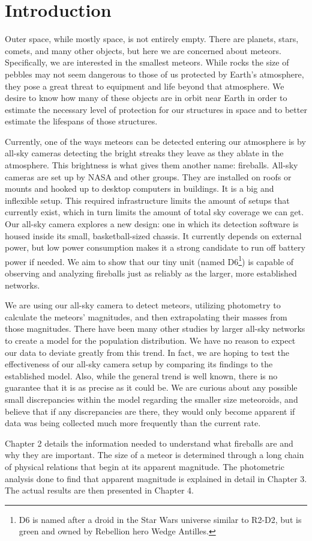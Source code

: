 \chapter{Introduction}

Outer space, while mostly space, is not entirely empty.  There are planets, stars, comets, and many other objects, but here we are concerned about meteors. Specifically, we are interested in the smallest meteors. While rocks the size of pebbles may not seem dangerous to those of us protected by Earth's atmosphere, they pose a great threat to equipment and life beyond that atmosphere. We desire to know how many of these objects are in orbit near Earth in order to estimate the necessary level of protection for our structures in space and to better estimate the lifespans of those structures.

Currently, one of the ways meteors can be detected entering our atmosphere is by all-sky cameras detecting the bright streaks they leave as they ablate in the atmosphere. This brightness is what gives them another name: fireballs. All-sky cameras are set up by NASA and other groups\cite{Jenniskens2011,Trigo-Rodriguez2007}. They are installed on roofs or mounts and hooked up to desktop computers in buildings. It is a big and inflexible setup. This required infrastructure limits the amount of setups that currently exist, which in turn limits the amount of total sky coverage we can get. Our all-sky camera explores a new design: one in which its detection software is housed inside its small, basketball-sized chassis. It currently depends on external power, but low power consumption makes it a strong candidate to run off battery power if needed. We aim to show that our tiny unit (named D6\footnote{D6 is named after a droid in the Star Wars universe similar to R2-D2, but is green and owned by Rebellion hero Wedge Antilles.}) is capable of observing and analyzing fireballs just as reliably as the larger, more established networks.

We are using our all-sky camera to detect meteors, utilizing photometry to calculate the meteors' magnitudes, and then extrapolating their masses from those magnitudes. There have been many other studies by larger all-sky networks to create a model for the population distribution. We have no reason to expect our data to deviate greatly from this trend. In fact, we are hoping to test the effectiveness of our all-sky camera setup by comparing its findings to the established model. Also, while the general trend is well known, there is no guarantee that it is as precise as it could be. We are curious about any possible small discrepancies within the model regarding the smaller size meteoroids, and believe that if any discrepancies are there, they would only become apparent if data was being collected much more frequently than the current rate.

Chapter 2 details the information needed to understand what fireballs are and why they are important. The size of a meteor is determined through a long chain of physical relations that begin at its apparent magnitude. The photometric analysis done to find that apparent magnitude is explained in detail in Chapter 3. The actual results are then presented in Chapter 4.

